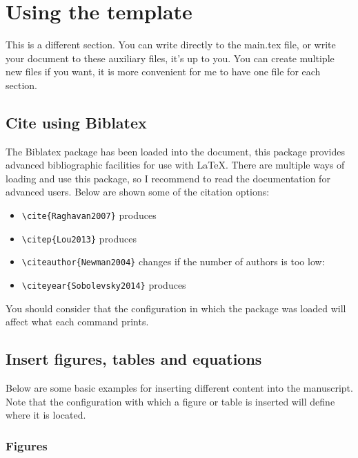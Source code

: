 \section{Using the template}

This is a different section. You can write directly to the main.tex file, or write your document to these auxiliary files, it's up to you. You can create multiple new files if you want, it is more convenient for me to have one file for each section.

\subsection{Cite using Biblatex}

The Biblatex package has been loaded into the document, this package provides advanced bibliographic facilities for use with LaTeX. There are multiple ways of loading and use this package, so I recommend to read the documentation for advanced users. Below are shown some of the citation options:

\begin{itemize}
    \item \verb+\cite{Raghavan2007}+ produces \cite{Raghavan2007}
    \item \verb+\citep{Lou2013}+ produces \citep{Lou2013}
    \item \verb+\citeauthor{Newman2004}+ changes if the number of authors is too low: \citeauthor{Newman2004}
    \item \verb+\citeyear{Sobolevsky2014}+ produces \citeyear{Sobolevsky2014}
\end{itemize}

You should consider that the configuration in which the package was loaded will affect what each command prints.

\subsection{Insert figures, tables and equations}

Below are some basic examples for inserting different content into the manuscript. Note that the configuration with which a figure or table is inserted will define where it is located.

\subsubsection{Figures}

